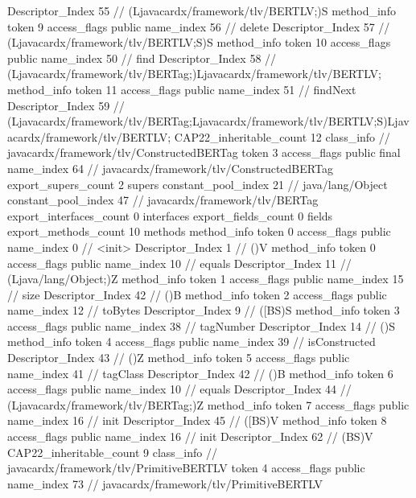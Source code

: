{{{{{					Descriptor_Index	55		// (Ljavacardx/framework/tlv/BERTLV;)S
				}
				method_info {
					token	9
					access_flags	public
					name_index	56		// delete
					Descriptor_Index	57		// (Ljavacardx/framework/tlv/BERTLV;S)S
				}
				method_info {
					token	10
					access_flags	public
					name_index	50		// find
					Descriptor_Index	58		// (Ljavacardx/framework/tlv/BERTag;)Ljavacardx/framework/tlv/BERTLV;
				}
				method_info {
					token	11
					access_flags	public
					name_index	51		// findNext
					Descriptor_Index	59		// (Ljavacardx/framework/tlv/BERTag;Ljavacardx/framework/tlv/BERTLV;S)Ljavacardx/framework/tlv/BERTLV;
				}
			}
			CAP22_inheritable_count	12
		}
		class_info {		// javacardx/framework/tlv/ConstructedBERTag
			token	3
			access_flags	public final
			name_index	64		// javacardx/framework/tlv/ConstructedBERTag
			export_supers_count	2
			supers {
				constant_pool_index	21		// java/lang/Object
				constant_pool_index	47		// javacardx/framework/tlv/BERTag
			}
			export_interfaces_count	0
			interfaces {
			}
			export_fields_count	0
			fields {
			}
			export_methods_count	10
			methods {
				method_info {
					token	0
					access_flags	public
					name_index	0		// <init>
					Descriptor_Index	1		// ()V
				}
				method_info {
					token	0
					access_flags	public
					name_index	10		// equals
					Descriptor_Index	11		// (Ljava/lang/Object;)Z
				}
				method_info {
					token	1
					access_flags	public
					name_index	15		// size
					Descriptor_Index	42		// ()B
				}
				method_info {
					token	2
					access_flags	public
					name_index	12		// toBytes
					Descriptor_Index	9		// ([BS)S
				}
				method_info {
					token	3
					access_flags	public
					name_index	38		// tagNumber
					Descriptor_Index	14		// ()S
				}
				method_info {
					token	4
					access_flags	public
					name_index	39		// isConstructed
					Descriptor_Index	43		// ()Z
				}
				method_info {
					token	5
					access_flags	public
					name_index	41		// tagClass
					Descriptor_Index	42		// ()B
				}
				method_info {
					token	6
					access_flags	public
					name_index	10		// equals
					Descriptor_Index	44		// (Ljavacardx/framework/tlv/BERTag;)Z
				}
				method_info {
					token	7
					access_flags	public
					name_index	16		// init
					Descriptor_Index	45		// ([BS)V
				}
				method_info {
					token	8
					access_flags	public
					name_index	16		// init
					Descriptor_Index	62		// (BS)V
				}
			}
			CAP22_inheritable_count	9
		}
		class_info {		// javacardx/framework/tlv/PrimitiveBERTLV
			token	4
			access_flags	public
			name_index	73		// javacardx/framework/tlv/PrimitiveBERTLV
}}}
